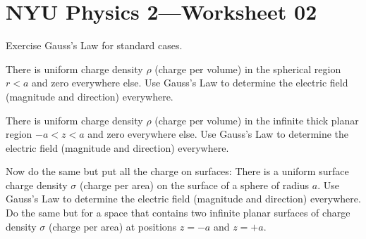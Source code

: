 \documentclass[12pt]{article}
\begin{document}
\section*{NYU Physics 2---Worksheet 02}

Exercise Gauss's Law for standard cases.

\startproblem%
There is uniform charge density $\rho$ (charge per volume) in the spherical region $r<a$ and zero everywhere else.
Use Gauss's Law to determine the electric field (magnitude and direction) everywhere.

\startproblem%
There is uniform charge density $\rho$ (charge per volume) in the infinite thick planar region $-a<z<a$ and zero everywhere else.
Use Gauss's Law to determine the electric field (magnitude and direction) everywhere.

\startproblem%
Now do the same but put all the charge on surfaces:
There is a uniform surface charge density $\sigma$ (charge per area) on the surface of a sphere of radius $a$.
Use Gauss's Law to determine the electric field (magnitude and direction) everywhere.
Do the same but for a space that contains two infinite planar surfaces of charge density $\sigma$ (charge per area) at positions $z=-a$ and $z=+a$.
\end{document}
